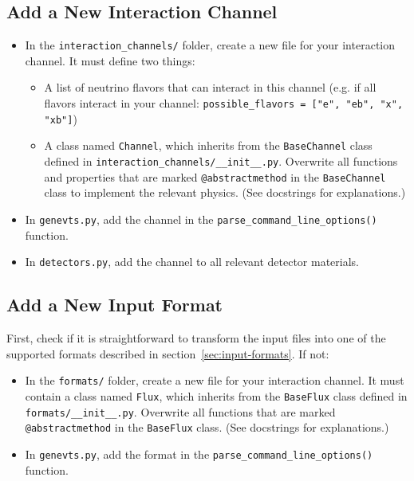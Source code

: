 \documentclass[11pt, oneside]{article}
\begin{document}
\subsection{Add a New Interaction Channel}\label{sec:new-interaction-channel}

\begin{itemize}
\item In the \texttt{interaction\_channels/} folder, create a new file for your interaction channel. It must define two things:
	\begin{itemize}
		\item A list of neutrino flavors that can interact in this channel (e.g. if all flavors interact in your channel: \texttt{possible\_flavors = ["e", "eb", "x", "xb"]})
		\item A class named \texttt{Channel}, which inherits from the \texttt{BaseChannel} class defined in \texttt{interaction\_channels/\_\_init\_\_.py}. Overwrite all functions and properties that are marked \texttt{@abstractmethod} in the \texttt{BaseChannel} class to implement the relevant physics.
		(See docstrings for explanations.)
	\end{itemize}
\item In \texttt{genevts.py}, add the channel in the \texttt{parse\_command\_line\_options()} function.
\item In \texttt{detectors.py}, add the channel to all relevant detector materials.
\end{itemize}


\subsection{Add a New Input Format}\label{sec:new-input-format}
First, check if it is straightforward to transform the input files into one of the supported formats described in section~\ref{sec:input-formats}.
If not:
\begin{itemize}
\item In the \texttt{formats/} folder, create a new file for your interaction channel. It must contain a class named \texttt{Flux}, which inherits from the \texttt{BaseFlux} class defined in \texttt{formats/\_\_init\_\_.py}. Overwrite all functions that are marked \texttt{@abstractmethod} in the \texttt{BaseFlux} class.
(See docstrings for explanations.)
\item In \texttt{genevts.py}, add the format in the \texttt{parse\_command\_line\_options()} function.
\end{itemize}


\clearpage
\footnotesize %


\end{document}
